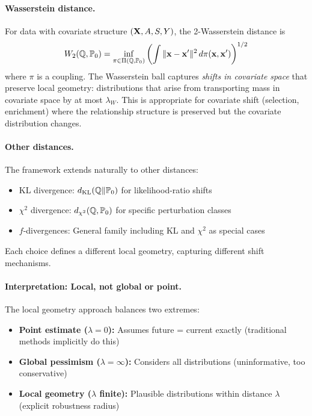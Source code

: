 \documentclass{article}
\newcommand{\PP}{\mathbb{P}}
\begin{document}
\paragraph{Wasserstein distance.}
For data with covariate structure $(\mathbf{X}, A, S, Y)$, the 2-Wasserstein distance is
\begin{equation}
    W_2(\Q, \PP_0) = \inf_{\pi \in \Pi(\Q, \PP_0)} \left( \int \|\bx - \bx'\|^2 \, d\pi(\bx, \bx') \right)^{1/2}
\end{equation}
where $\pi$ is a coupling. The Wasserstein ball captures \emph{shifts in covariate space} that preserve local geometry: distributions that arise from transporting mass in covariate space by at most $\lambda_W$. This is appropriate for covariate shift (selection, enrichment) where the relationship structure is preserved but the covariate distribution changes.

\paragraph{Other distances.}
The framework extends naturally to other distances:
\begin{itemize}
    \item KL divergence: $d_{\mathrm{KL}}(\Q \| \PP_0)$ for likelihood-ratio shifts
    \item $\chi^2$ divergence: $d_{\chi^2}(\Q, \PP_0)$ for specific perturbation classes
    \item $f$-divergences: General family including KL and $\chi^2$ as special cases
\end{itemize}
Each choice defines a different local geometry, capturing different shift mechanisms.

\paragraph{Interpretation: Local, not global or point.}
The local geometry approach balances two extremes:
\begin{itemize}
    \item \textbf{Point estimate ($\lambda = 0$):} Assumes future = current exactly (traditional methods implicitly do this)
    \item \textbf{Global pessimism ($\lambda = \infty$):} Considers all distributions (uninformative, too conservative)
    \item \textbf{Local geometry ($\lambda$ finite):} Plausible distributions within distance $\lambda$ (explicit robustness radius)
\end{itemize}
\end{document}
